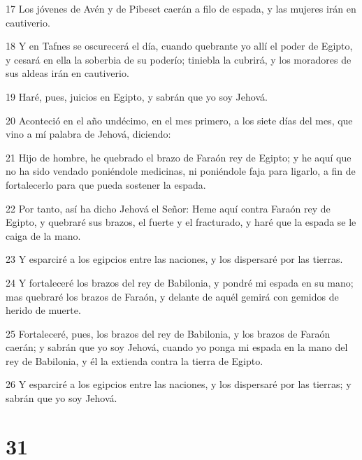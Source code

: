 \par 17 Los jóvenes de Avén y de Pibeset caerán a filo de espada, y las mujeres irán en cautiverio.
\par 18 Y en Tafnes se oscurecerá el día, cuando quebrante yo allí el poder de Egipto, y cesará en ella la soberbia de su poderío; tiniebla la cubrirá, y los moradores de sus aldeas irán en cautiverio.
\par 19 Haré, pues, juicios en Egipto, y sabrán que yo soy Jehová.
\par 20 Aconteció en el año undécimo, en el mes primero, a los siete días del mes, que vino a mí palabra de Jehová, diciendo:
\par 21 Hijo de hombre, he quebrado el brazo de Faraón rey de Egipto; y he aquí que no ha sido vendado poniéndole medicinas, ni poniéndole faja para ligarlo, a fin de fortalecerlo para que pueda sostener la espada.
\par 22 Por tanto, así ha dicho Jehová el Señor: Heme aquí contra Faraón rey de Egipto, y quebraré sus brazos, el fuerte y el fracturado, y haré que la espada se le caiga de la mano.
\par 23 Y esparciré a los egipcios entre las naciones, y los dispersaré por las tierras.
\par 24 Y fortaleceré los brazos del rey de Babilonia, y pondré mi espada en su mano; mas quebraré los brazos de Faraón, y delante de aquél gemirá con gemidos de herido de muerte.
\par 25 Fortaleceré, pues, los brazos del rey de Babilonia, y los brazos de Faraón caerán; y sabrán que yo soy Jehová, cuando yo ponga mi espada en la mano del rey de Babilonia, y él la extienda contra la tierra de Egipto.
\par 26 Y esparciré a los egipcios entre las naciones, y los dispersaré por las tierras; y sabrán que yo soy Jehová.

\chapter{31}

